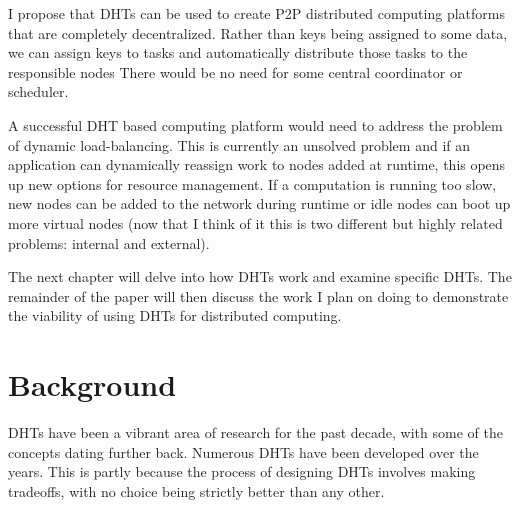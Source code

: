 \documentclass[10pt,letterpaper,twoside]{report}
\begin{document}
I propose that DHTs can be used to create P2P distributed computing platforms that are completely decentralized.
Rather than keys being assigned to some data, we can assign keys to tasks and automatically distribute those tasks to the responsible nodes
There would be no need for some central coordinator or scheduler.

A successful DHT based computing platform would need to address the problem of dynamic load-balancing.
This is currently an unsolved problem and if an application can dynamically reassign work to nodes added at runtime, this opens up new options for resource management.
If a computation  is running too slow, new nodes can be added to the network  during runtime or idle nodes can boot up more virtual nodes (now that I think of it this is two different but highly related problems: internal and external).


The next chapter will delve into how DHTs work and examine specific DHTs.
The remainder of the paper will then discuss the work I plan on doing to demonstrate the viability of using DHTs for distributed computing.





\chapter{Background}
\label{chapter:background}

DHTs have been a vibrant area of research for the past decade, with some of the concepts dating further back.
Numerous DHTs have been developed over the years.
This is partly because the process of designing DHTs involves making tradeoffs, with no choice being strictly better than any other.
\end{document}
